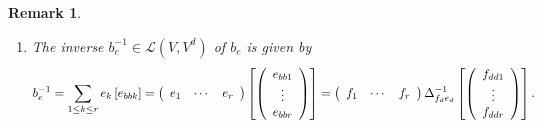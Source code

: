 \documentclass[aps,preprint]{revtex4}
\newtheorem{remark}[theorem]{Remark}
\begin{document}
\begin{remark}
\begin{enumerate}
\item The inverse $b_{e}^{-1}\in \mathcal{L}\left( V,V^{d}\right) $ of $%
b_{e} $ is given by%
\begin{equation}
b_{e}^{-1}=\sum_{1\leq k\leq r}e_{k}\left[ e_{bbk}\right] =\left( 
\begin{array}{ccc}
e_{1} & \cdots & e_{r}%
\end{array}%
\right) \left[ \left( 
\begin{array}{c}
e_{bb1} \\ 
\vdots \\ 
e_{bbr}%
\end{array}%
\right) \right] =\left( 
\begin{array}{ccc}
f_{1} & \cdots & f_{r}%
\end{array}%
\right) {\LARGE \Delta }_{f_{d}e_{d}}^{-1}\left[ \left( 
\begin{array}{c}
f_{dd1} \\ 
\vdots \\ 
f_{ddr}%
\end{array}%
\right) \right] .
\end{equation}
\end{enumerate}
\end{remark}
\end{document}

